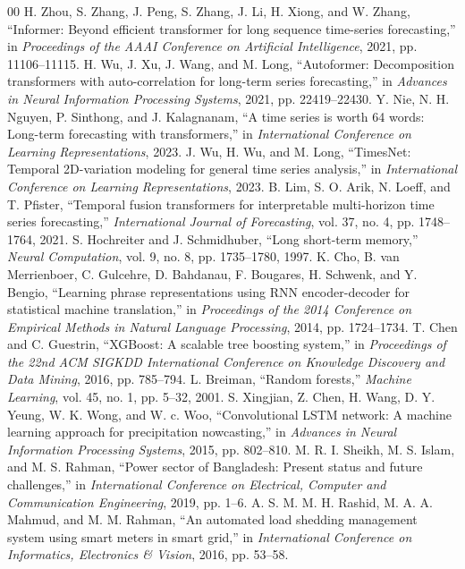 \begin{thebibliography}{00}
 H. Zhou, S. Zhang, J. Peng, S. Zhang, J. Li, H. Xiong, and W. Zhang, ``Informer: Beyond efficient transformer for long sequence time-series forecasting,'' in \textit{Proceedings of the AAAI Conference on Artificial Intelligence}, 2021, pp. 11106--11115.
 H. Wu, J. Xu, J. Wang, and M. Long, ``Autoformer: Decomposition transformers with auto-correlation for long-term series forecasting,'' in \textit{Advances in Neural Information Processing Systems}, 2021, pp. 22419--22430.
 Y. Nie, N. H. Nguyen, P. Sinthong, and J. Kalagnanam, ``A time series is worth 64 words: Long-term forecasting with transformers,'' in \textit{International Conference on Learning Representations}, 2023.
 J. Wu, H. Wu, and M. Long, ``TimesNet: Temporal 2D-variation modeling for general time series analysis,'' in \textit{International Conference on Learning Representations}, 2023.
 B. Lim, S. O. Arik, N. Loeff, and T. Pfister, ``Temporal fusion transformers for interpretable multi-horizon time series forecasting,'' \textit{International Journal of Forecasting}, vol. 37, no. 4, pp. 1748--1764, 2021.
 S. Hochreiter and J. Schmidhuber, ``Long short-term memory,'' \textit{Neural Computation}, vol. 9, no. 8, pp. 1735--1780, 1997.
 K. Cho, B. van Merrienboer, C. Gulcehre, D. Bahdanau, F. Bougares, H. Schwenk, and Y. Bengio, ``Learning phrase representations using RNN encoder-decoder for statistical machine translation,'' in \textit{Proceedings of the 2014 Conference on Empirical Methods in Natural Language Processing}, 2014, pp. 1724--1734.
 T. Chen and C. Guestrin, ``XGBoost: A scalable tree boosting system,'' in \textit{Proceedings of the 22nd ACM SIGKDD International Conference on Knowledge Discovery and Data Mining}, 2016, pp. 785--794.
 L. Breiman, ``Random forests,'' \textit{Machine Learning}, vol. 45, no. 1, pp. 5--32, 2001.
 S. Xingjian, Z. Chen, H. Wang, D. Y. Yeung, W. K. Wong, and W. c. Woo, ``Convolutional LSTM network: A machine learning approach for precipitation nowcasting,'' in \textit{Advances in Neural Information Processing Systems}, 2015, pp. 802--810.
 M. R. I. Sheikh, M. S. Islam, and M. S. Rahman, ``Power sector of Bangladesh: Present status and future challenges,'' in \textit{International Conference on Electrical, Computer and Communication Engineering}, 2019, pp. 1--6.
 A. S. M. M. H. Rashid, M. A. A. Mahmud, and M. M. Rahman, ``An automated load shedding management system using smart meters in smart grid,'' in \textit{International Conference on Informatics, Electronics \& Vision}, 2016, pp. 53--58.

\end{thebibliography}
